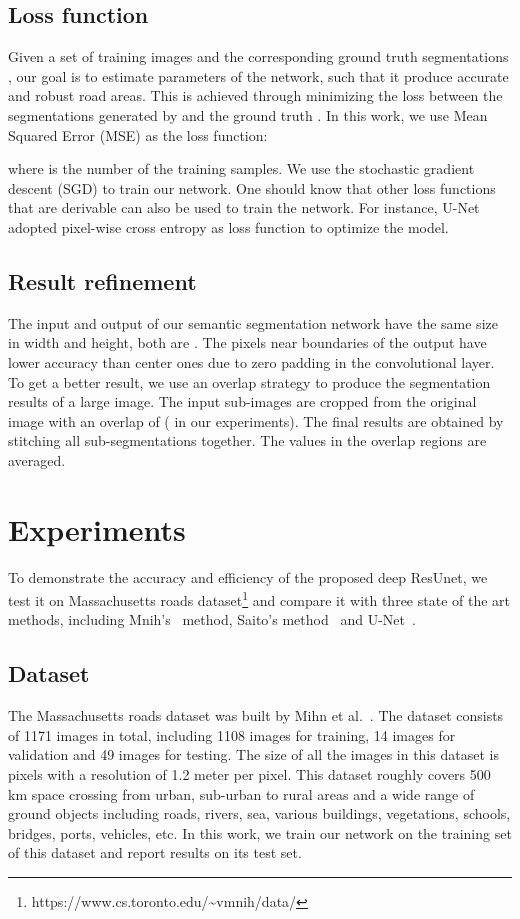 \documentclass[journal]{IEEEtran}
\begin{document}
\subsection{Loss function}
Given a set of training images and the corresponding ground truth segmentations , our goal is to estimate parameters  of the network, such that it produce accurate and robust road areas. This is achieved through minimizing the loss between the  segmentations generated by  and the ground truth . In this work, we use Mean Squared Error (MSE) as the loss function:

where  is the number of the training samples. We use the stochastic gradient descent (SGD) to train our network. One should know that other loss functions that are derivable can also be used to train the network. For instance, U-Net adopted pixel-wise cross entropy as loss function to optimize the model. 


\subsection{Result refinement}

The input and output of our semantic segmentation network have the same size in width and height, both are . The pixels near  boundaries of the output have lower accuracy than center ones due to zero padding in the convolutional layer. To get a better result, we use an overlap strategy to produce the segmentation results of a large image. The input sub-images are cropped from the original image with an overlap of  ( in our experiments). The final results are obtained by stitching all sub-segmentations together. The values in the overlap regions are averaged. 

\vspace{-0.2cm}
\section{Experiments}
\label{sec:experiment}

To demonstrate the accuracy and efficiency of the proposed deep ResUnet, we test it on Massachusetts roads dataset\footnote{https://www.cs.toronto.edu/\~{}vmnih/data/} and compare it with three state of the art methods, including Mnih's~\cite{mnih2010learning} method, Saito's method~\cite{Saito2016Multiple} and U-Net~\cite{U-NET2015}. 

\vspace{-0.2cm}
\subsection{Dataset}
The Massachusetts roads dataset was built by Mihn et al.~\cite{mnih2010learning}. The dataset consists of 1171 images in total, including 1108 images for training, 14 images for validation and 49 images for testing. The size of all the images in this dataset is  pixels with a resolution of 1.2 meter per pixel. This dataset roughly covers 500 km space crossing from urban, sub-urban to rural areas and a wide range of ground objects including roads, rivers, sea, various buildings, vegetations, schools, bridges, ports, vehicles, etc. In this work, we train our network on the training set of this dataset and report results on its test set.
\end{document}
